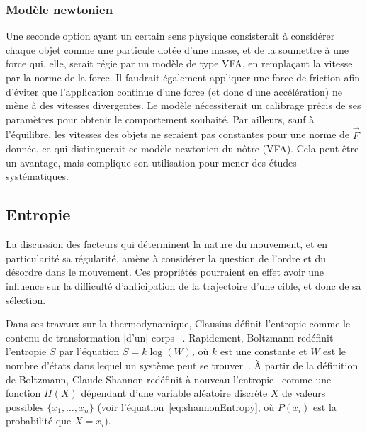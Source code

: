     \subsubsection{Modèle newtonien}
    Une seconde option ayant un certain sens physique consisterait à considérer chaque objet comme une particule dotée d'une masse, et de la soumettre à une force qui, elle, serait régie par un modèle de type VFA, en remplaçant la vitesse par la norme de la force. Il faudrait également appliquer une force de friction afin d'éviter que l'application continue d'une force (et donc d'une accélération\footnotemark{}) ne mène à des vitesses divergentes. Le modèle nécessiterait un calibrage précis de ses paramètres pour obtenir le comportement souhaité. Par ailleurs, sauf à l'équilibre, les vitesses des objets ne seraient pas constantes pour une norme de $\vec{F}$ donnée, ce qui distinguerait ce modèle newtonien du nôtre (VFA). Cela peut être un avantage, mais complique son utilisation pour mener des études systématiques.
    
	
	\subsection{Entropie}
	La discussion des facteurs qui déterminent la nature du mouvement, et en particularité sa régularité, amène à considérer la question de l'ordre et du désordre dans le mouvement. Ces propriétés pourraient en effet avoir une influence sur la difficulté d'anticipation de la trajectoire d'une cible, et donc de sa sélection.
	
	Dans ses travaux sur la thermodynamique, Clausius définit l'entropie comme \og le contenu de transformation [d'un] corps \fg{}~\cite{clausius1865verschiedene, clausius1865diverses}. Rapidement, Boltzmann redéfinit l'entropie $S$ par l'équation $S = k\log(W)$, où $k$ est une constante et $W$ est le nombre d'états dans lequel un système peut se trouver~\cite{boltzmann1866mechanische, weisstein2004eric}. À partir de la définition de Boltzmann, Claude Shannon redéfinit à nouveau l'entropie~\cite{shannon1949communication} comme une fonction $H(X)$ dépendant d'une variable aléatoire discrète $X$ de valeurs possibles $\{x_{1}, \ldots{}, x_{n}\}$ (voir l'équation~\ref{eq:shannonEntropy}, où $P(x_{i})$ est la probabilité que $X=x_{i}$).
	
